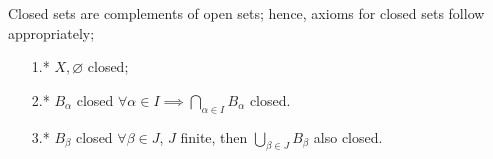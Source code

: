 \begin{definition}
    Closed sets are complements of open sets; hence, axioms for closed sets follow appropriately;
    \begin{enumerate}
        \item[1.*] $X, \varnothing$ closed;
        \item[2.*] $B_\alpha$ closed $\forall \alpha \in I \implies \bigcap_{\alpha \in I} B_\alpha$ closed.
        \item[3.*] $B_\beta$ closed $\forall \beta \in J$, $J$ finite, then $\bigcup_{\beta \in J} B_\beta$ also closed. 
    \end{enumerate}
\end{definition}